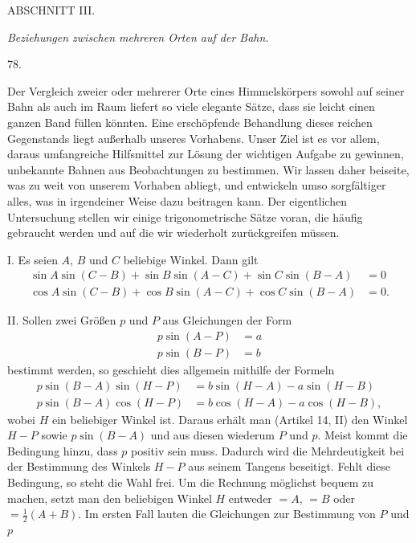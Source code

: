 \clearpage
{}
\begin{center}
{\large ABSCHNITT III.}\par\medskip
\emph{Beziehungen zwischen mehreren Orten auf der Bahn.}\par\bigskip
\hypertarget{native-106-article078}{}78.
\end{center}
Der Vergleich zweier oder mehrerer Orte eines Himmelskörpers sowohl auf seiner Bahn als auch im Raum liefert so viele elegante Sätze, dass sie leicht einen ganzen Band füllen könnten. Eine erschöpfende Behandlung dieses reichen Gegenstands liegt außerhalb unseres Vorhabens. Unser Ziel ist es vor allem, daraus umfangreiche Hilfsmittel zur Lösung der wichtigen Aufgabe zu gewinnen, unbekannte Bahnen aus Beobachtungen zu bestimmen. Wir lassen daher beiseite, was zu weit von unserem Vorhaben abliegt, und entwickeln umso sorgfältiger alles, was in irgendeiner Weise dazu beitragen kann. Der eigentlichen Untersuchung stellen wir einige trigonometrische Sätze voran, die häufig gebraucht werden und auf die wir wiederholt zurückgreifen müssen.
\par
I. Es seien $A$, $B$ und $C$ beliebige Winkel. Dann gilt
\[
\begin{aligned}
\sin A\sin(C-B)+\sin B\sin(A-C)+\sin C\sin(B-A)&=0\\
\cos A\sin(C-B)+\cos B\sin(A-C)+\cos C\sin(B-A)&=0.
\end{aligned}
\]
\par
II. Sollen zwei Größen $p$ und $P$ aus Gleichungen der Form
\[
\begin{aligned}
p\sin(A-P)&=a\\
p\sin(B-P)&=b
\end{aligned}
\]
bestimmt werden, so geschieht dies allgemein mithilfe der Formeln
\[
\begin{aligned}
p\sin(B-A)\sin(H-P)&=b\sin(H-A)-a\sin(H-B)\\
p\sin(B-A)\cos(H-P)&=b\cos(H-A)-a\cos(H-B),
\end{aligned}
\]
wobei $H$ ein beliebiger Winkel ist. Daraus erhält man (Artikel 14, II) den Winkel $H-P$ sowie $p\sin(B-A)$ und aus diesen wiederum $P$ und $p$. Meist kommt die Bedingung hinzu, dass $p$ positiv sein muss. Dadurch wird die Mehrdeutigkeit bei der Bestimmung des Winkels $H-P$ aus seinem Tangens beseitigt. Fehlt diese Bedingung, so steht die Wahl frei. Um die Rechnung möglichst bequem zu machen, setzt man den beliebigen Winkel $H$ entweder $=A$, $=B$ oder $=\tfrac{1}{2}(A+B)$. Im ersten Fall lauten die Gleichungen zur Bestimmung von $P$ und $p$
